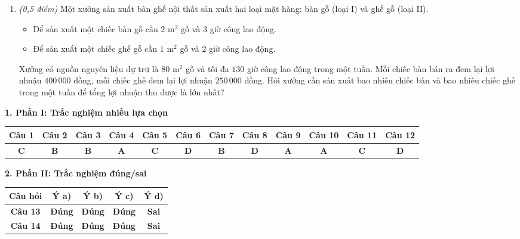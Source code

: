 \documentclass[12pt,a4paper]{article}
\newcommand{\parttitle}[1]{\par\vspace{2pt}{\large\bfseries\color{ink}#1}\par\vspace{1pt}}
\begin{document}
\begin{enumerate}[resume]
\item \textit{(0,5 điểm)} Một xưởng sản xuất bàn ghế nội thất sản xuất hai loại mặt hàng: bàn gỗ (loại I) và ghế gỗ (loại II).
\begin{itemize}[leftmargin=0.5cm]
    \item Để sản xuất một chiếc bàn gỗ cần $2\text{ m}^2$ gỗ và $3$ giờ công lao động.
    \item Để sản xuất một chiếc ghế gỗ cần $1\text{ m}^2$ gỗ và $2$ giờ công lao động.
\end{itemize}
Xưởng có nguồn nguyên liệu dự trữ là $80\text{ m}^2$ gỗ và tối đa $130$ giờ công lao động trong một tuần. Mỗi chiếc bàn bán ra đem lại lợi nhuận $400\,000$ đồng, mỗi chiếc ghế đem lại lợi nhuận $250\,000$ đồng. Hỏi xưởng cần sản xuất bao nhiêu chiếc bàn và bao nhiêu chiếc ghế trong một tuần để tổng lợi nhuận thu được là lớn nhất?
\end{enumerate}

\newpage
\parttitle{BẢNG ĐÁP ÁN TỔNG HỢP}

\vspace{0.2cm}
\textbf{1. Phần I: Trắc nghiệm nhiều lựa chọn}
\begin{center}
{\setlength{\tabcolsep}{2.5pt}\small
\begin{tabular}{|c|c|c|c|c|c|c|c|c|c|c|c|}
\hline
\textbf{Câu 1} & \textbf{Câu 2} & \textbf{Câu 3} & \textbf{Câu 4} & \textbf{Câu 5} & \textbf{Câu 6} & \textbf{Câu 7} & \textbf{Câu 8} & \textbf{Câu 9} & \textbf{Câu 10} & \textbf{Câu 11} & \textbf{Câu 12} \\
\hline
\textbf{C} & \textbf{B} & \textbf{B} & \textbf{A} & \textbf{C} & \textbf{D} & \textbf{B} & \textbf{D} & \textbf{A} & \textbf{A} & \textbf{C} & \textbf{D} \\
\hline
\end{tabular}}
\end{center}

\vspace{0.2cm}
\textbf{2. Phần II: Trắc nghiệm đúng/sai}
\begin{center}
\begin{tabular}{|c|c|c|c|c|}
\hline
\textbf{Câu hỏi} & \textbf{Ý a)} & \textbf{Ý b)} & \textbf{Ý c)} & \textbf{Ý d)} \\
\hline
\textbf{Câu 13} & \textbf{Đúng} & \textbf{Đúng} & \textbf{Đúng} & \textbf{Sai} \\
\hline
\textbf{Câu 14} & \textbf{Đúng} & \textbf{Đúng} & \textbf{Đúng} & \textbf{Sai} \\
\hline
\end{tabular}
\end{center}
\end{document}
